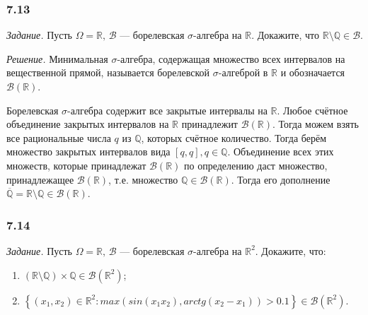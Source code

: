 \subsubsection*{7.13}

\textit{Задание.} Пусть $ \Omega = \mathbb{R}, \, \mathcal{B} $ --- борелевская $ \sigma $-алгебра на $ \mathbb{R} $.
Докажите, что $ \mathbb{R} \setminus \mathbb{Q} \in \mathcal{B} $.

\textit{Решение.} Минимальная $ \sigma $-алгебра,
содержащая множество всех интервалов на вещественной прямой,
называется борелевской $ \sigma $-алгеброй в $ \mathbb{R} $ и обозначается $ \mathcal{B} \left( \mathbb{R} \right) $.

Борелевская $ \sigma $-алгебра содержит все закрытые интервалы на $ \mathbb{R} $.
Любое счётное объединение закрытых интервалов на $ \mathbb{R} $ принадлежит $ \mathcal{B} \left( \mathbb{R} \right) $.
Тогда можем взять все рациональные числа $q$ из $ \mathbb{Q} $, которых счётное количество.
Тогда берём множество закрытых интервалов вида $ \left[ q, q \right], q \in \mathbb{Q} $.
Объединение всех этих множеств,
которые принадлежат $ \mathcal{B} \left( \mathbb{R} \right) $ по определению даст множество,
принадлежащее $ \mathcal{B} \left( \mathbb{R} \right) $, т.е. множество $ \mathbb{Q} \in \mathcal{B} \left( \mathbb{R} \right) $.
Тогда его дополнение $ \overline{ \mathbb{Q} } = \mathbb{R} \setminus \mathbb{Q} \in \mathcal{B} \left( \mathbb{R} \right) $.

\subsubsection*{7.14}

\textit{Задание.} Пусть $ \Omega = \mathbb{R}, \, \mathcal{B} $ --- борелевская $ \sigma $-алгебра на $ \mathbb{R}^2$.
Докажите, что:
\begin{enumerate}[label=\alph*)]
\item $ \left( \mathbb{R} \setminus \mathbb{Q} \right) \times \mathbb{Q} \in \mathcal{B} \left( \mathbb{R}^2 \right) $;
\item $ \left\{ \left( x_1, x_2 \right) \in \mathbb{R}^2:
max \left( sin \left( x_1 x_2 \right), arctg \left( x_2 - x_1 \right) \right) > 0.1 \right\} \in \mathcal{B} \left( \mathbb{R}^2 \right) $.
\end{enumerate}

